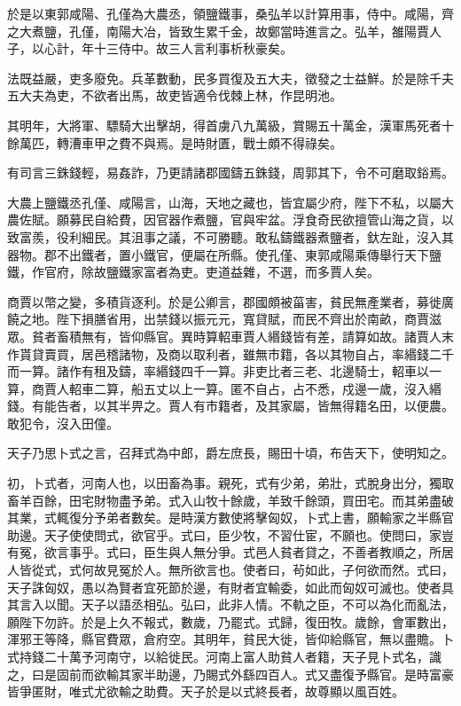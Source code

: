 於是以東郭咸陽、孔僅為大農丞，領鹽鐵事，桑弘羊以計算用事，侍中。咸陽，齊之大煮鹽，孔僅，南陽大冶，皆致生累千金，故鄭當時進言之。弘羊，雒陽賈人子，以心計，年十三侍中。故三人言利事析秋豪矣。

法既益嚴，吏多廢免。兵革數動，民多買復及五大夫，徵發之士益鮮。於是除千夫五大夫為吏，不欲者出馬，故吏皆適令伐棘上林，作昆明池。

其明年，大將軍、驃騎大出擊胡，得首虜八九萬級，賞賜五十萬金，漢軍馬死者十餘萬匹，轉漕車甲之費不與焉。是時財匱，戰士頗不得祿矣。

有司言三銖錢輕，易姦詐，乃更請諸郡國鑄五銖錢，周郭其下，令不可磨取鋊焉。

大農上鹽鐵丞孔僅、咸陽言，山海，天地之藏也，皆宜屬少府，陛下不私，以屬大農佐賦。願募民自給費，因官器作煮鹽，官與牢盆。浮食奇民欲擅管山海之貨，以致富羨，役利細民。其沮事之議，不可勝聽。敢私鑄鐵器煮鹽者，釱左趾，沒入其器物。郡不出鐵者，置小鐵官，便屬在所縣。使孔僅、東郭咸陽乘傳舉行天下鹽鐵，作官府，除故鹽鐵家富者為吏。吏道益雜，不選，而多賈人矣。

商賈以幣之變，多積貨逐利。於是公卿言，郡國頗被菑害，貧民無產業者，募徙廣饒之地。陛下損膳省用，出禁錢以振元元，寬貸賦，而民不齊出於南畝，商賈滋眾。貧者畜積無有，皆仰縣官。異時算軺車賈人緡錢皆有差，請算如故。諸賈人末作貰貸賣買，居邑稽諸物，及商以取利者，雖無市籍，各以其物自占，率緡錢二千而一算。諸作有租及鑄，率緡錢四千一算。非吏比者三老、北邊騎士，軺車以一算，商賈人軺車二算，船五丈以上一算。匿不自占，占不悉，戍邊一歲，沒入緡錢。有能告者，以其半畀之。賈人有市籍者，及其家屬，皆無得籍名田，以便農。敢犯令，沒入田僮。

天子乃思卜式之言，召拜式為中郎，爵左庶長，賜田十頃，布告天下，使明知之。

初，卜式者，河南人也，以田畜為事。親死，式有少弟，弟壯，式脫身出分，獨取畜羊百餘，田宅財物盡予弟。式入山牧十餘歲，羊致千餘頭，買田宅。而其弟盡破其業，式輒復分予弟者數矣。是時漢方數使將擊匈奴，卜式上書，願輸家之半縣官助邊。天子使使問式，欲官乎。式曰，臣少牧，不習仕宦，不願也。使問曰，家豈有冤，欲言事乎。式曰，臣生與人無分爭。式邑人貧者貸之，不善者教順之，所居人皆從式，式何故見冤於人。無所欲言也。使者曰，茍如此，子何欲而然。式曰，天子誅匈奴，愚以為賢者宜死節於邊，有財者宜輸委，如此而匈奴可滅也。使者具其言入以聞。天子以語丞相弘。弘曰，此非人情。不軌之臣，不可以為化而亂法，願陛下勿許。於是上久不報式，數歲，乃罷式。式歸，復田牧。歲餘，會軍數出，渾邪王等降，縣官費眾，倉府空。其明年，貧民大徙，皆仰給縣官，無以盡贍。卜式持錢二十萬予河南守，以給徙民。河南上富人助貧人者籍，天子見卜式名，識之，曰是固前而欲輸其家半助邊，乃賜式外繇四百人。式又盡復予縣官。是時富豪皆爭匿財，唯式尤欲輸之助費。天子於是以式終長者，故尊顯以風百姓。

